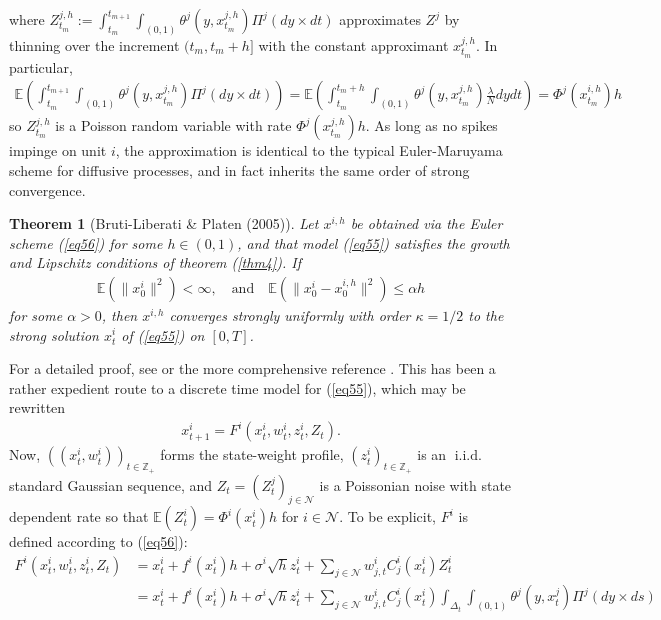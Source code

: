\documentclass[12pt, oneside]{report}
\newcommand{\E}{\mathbb{E}}
\newcommand{\mbb}[1]{\mathbb{#1}}
\newcommand{\1}[1]{\mathbbm{1}_{\{#1\}}}
\newcommand{\mc}[1]{\mathcal{#1}}
\DeclareMathOperator{\iid}{i.i.d.}
\newtheorem{theorem}{Theorem}[section]
\theoremstyle{definition}
\begin{document}
where
$Z^{j,h}_{t_m}:=\int_{t_m}^{t_{m+1}}\int_{(0,1)}\theta^j(y,x^{j,h}_{t_m})\Pi^j(dy\times
dt)$ approximates $Z^j$ by thinning over the increment $(t_m,t_m+h]$ with the
constant approximant $x^{j,h}_{t_m}$. In particular,
\begin{align*}
    \E\left(\int_{t_m}^{t_{m+1}}\int_{(0,1)}\theta^j(y,x^{j,h}_{t_m})\Pi^j(dy\times dt)\right)=\E\left(\int_{t_m}^{t_m+h}\int_{(0,1)}\theta^j(y,x^{j,h}_{t_m})\frac{\lambda}{N}dydt\right)=\Phi^j(x^{i,h}_{t_m})h
\end{align*}
so $Z^{j,h}_{t_m}$ is a Poisson random variable with rate
$\Phi^j(x^{j,h}_{t_m})h$. As long as no spikes impinge on unit $i$, the
approximation is identical to the typical Euler-Maruyama scheme for diffusive
processes, and in fact inherits the same order of strong convergence.
\begin{theorem}[Bruti-Liberati \& Platen (2005)]\label{thm13}
    Let $x^{i,h}$ be obtained via the Euler scheme (\ref{eq56}) for some
    $h\in(0,1)$, and that model (\ref{eq55}) satisfies the growth and Lipschitz
    conditions of theorem (\ref{thm4}). If
    \begin{align*}
        \E(\|x^i_0\|^2)<\infty,\quad\text{and}\quad \E(\|x^i_0-x^{i,h}_0\|^2)\leq \alpha h
    \end{align*}
    for some $\alpha>0$, then $x^{i,h}$ converges strongly uniformly with order
    $\kappa=1/2$ to the strong solution $x^i_t$ of (\ref{eq55}) on $[0,T]$.
\end{theorem} 
For a detailed proof, see \cite[theorem 6.1]{Bruti-Liberati_Platen_2005} or the
more comprehensive reference \cite[theorem 6.4.1]{Platen_Bruti_Liberati_2010}.
This has been a rather expedient route to a discrete time model for
(\ref{eq55}), which may be rewritten
\begin{align}
    x^i_{t+1}=F^i(x^i_t,w^i_t,z^i_t,Z_t).\label{eq57}
\end{align}
Now, $((x^i_t, w^i_t))_{t\in\mbb{Z}_+}$ forms the state-weight profile,
$(z^i_t)_{t\in\mbb{Z}_+}$ is an $\iid$ standard Gaussian sequence, and
$Z_t=(Z^j_t)_{j\in\mc{N}}$ is a Poissonian noise with state dependent rate so
that $\E(Z^i_t)=\Phi^i(x^i_t)h$ for $i\in\mc{N}$. To be explicit, $F^i$ is
defined according to (\ref{eq56}):
\begin{align}
    F^i(x^i_t,w^i_t,z^i_t,Z_t)&=x^i_t+f^i(x^i_t)h+\sigma^i\sqrt{h}z^i_t+\sum_{j\in\mc{N}}w^i_{j,t}C^i_j(x^i_t)Z^i_t\\
    &=x^i_t+f^i(x^i_t)h+\sigma^i\sqrt{h}z^i_t+\sum_{j\in\mc{N}}w^i_{j,t}C^i_j(x^i_t)\int_{\Delta_t}\int_{(0,1)}\theta^j(y,x^j_t)\Pi^j(dy\times ds)\label{eq63}
\end{align}
\end{document}
